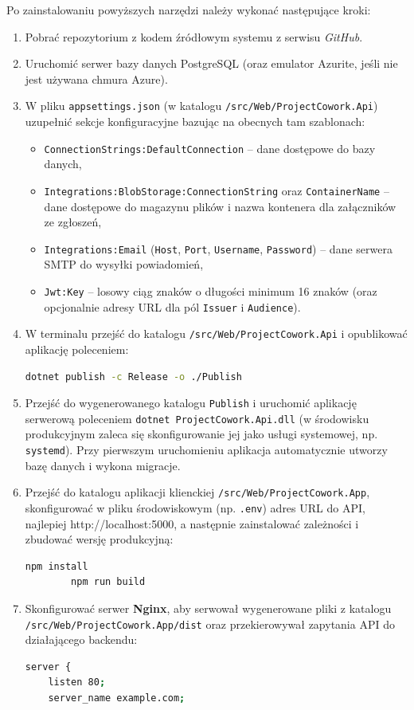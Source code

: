 Po zainstalowaniu powyższych narzędzi należy wykonać następujące kroki:
\begin{enumerate}
    \item Pobrać repozytorium z kodem źródłowym systemu z serwisu \textit{GitHub}.
    \item Uruchomić serwer bazy danych PostgreSQL (oraz emulator Azurite, jeśli nie jest używana chmura Azure).
    \item W pliku \texttt{appsettings.json} (w katalogu \texttt{/src/Web/ProjectCowork.Api}) uzupełnić sekcje konfiguracyjne bazując na obecnych tam szablonach:
    \begin{itemize}
        \item \texttt{ConnectionStrings:DefaultConnection} -- dane dostępowe do bazy danych,
        \item \texttt{Integrations:BlobStorage:ConnectionString} oraz \texttt{ContainerName} -- dane dostępowe do magazynu plików i nazwa kontenera dla załączników ze zgłoszeń,
        \item \texttt{Integrations:Email} (\texttt{Host}, \texttt{Port}, \texttt{Username}, \texttt{Password}) -- dane serwera SMTP do wysyłki powiadomień,
        \item \texttt{Jwt:Key} -- losowy ciąg znaków o długości minimum 16 znaków (oraz opcjonalnie adresy URL dla pól \texttt{Issuer} i \texttt{Audience}).
    \end{itemize}
    \item W terminalu przejść do katalogu \texttt{/src/Web/ProjectCowork.Api} i opublikować aplikację poleceniem:
    \begin{lstlisting}[language=bash]
dotnet publish -c Release -o ./Publish
    \end{lstlisting}
    \item Przejść do wygenerowanego katalogu \texttt{Publish} i uruchomić aplikację serwerową poleceniem \texttt{dotnet ProjectCowork.Api.dll} (w środowisku produkcyjnym zaleca się skonfigurowanie jej jako usługi systemowej, np. \texttt{systemd}). Przy pierwszym uruchomieniu aplikacja automatycznie utworzy bazę danych i wykona migracje.
    \item Przejść do katalogu aplikacji klienckiej \texttt{/src/Web/ProjectCowork.App}, skonfigurować w pliku środowiskowym (np. \texttt{.env}) adres URL do API, najlepiej http://localhost:5000, a następnie zainstalować zależności i zbudować wersję produkcyjną:
    \begin{lstlisting}[language=bash]
        npm install
        npm run build
    \end{lstlisting}
    \item Skonfigurować serwer \textbf{Nginx}, aby serwował wygenerowane pliki z katalogu \texttt{/src/Web/ProjectCowork.App/dist} oraz przekierowywał zapytania API do działającego backendu:
    \begin{lstlisting}[language=bash]
server {
    listen 80;
    server_name example.com;


\end{lstlisting}
\end{enumerate}
